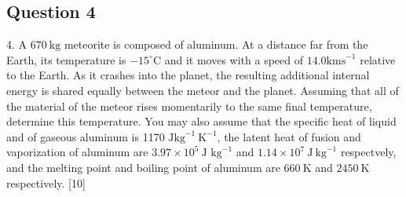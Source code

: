\documentclass{article}
\begin{document}
\subsection{Question 4}
4. A $670 \mathrm{~kg}$ meteorite is composed of aluminum. At a distance far from the Earth, its temperature is $-15^{\circ} \mathrm{C}$ and it moves with a speed of $14.0 \mathrm{ kms}^{-1}$ relative to the Earth. As it crashes into the planet, the resulting additional internal energy is shared equally between the meteor and the planet. Assuming that all of the material of the meteor rises momentarily to the same final temperature, determine this temperature. You may also assume that the specific heat of liquid and of gaseous aluminum is 1170 $\mathrm{Jkg}^{-1} \mathrm{~K}^{-1}$, the latent heat of fusion and vaporization of aluminum are $3.97 \times 10^{5} \mathrm{~J}$ $\mathrm{kg}^{-1}$ and $1.14 \times 10^{7} \mathrm{~J} \mathrm{~kg}^{-1}$ respectvely, and the melting point and boiling point of aluminum are $660 \mathrm{~K}$ and $2450 \mathrm{~K}$ respectively.
[10]
\end{document}
